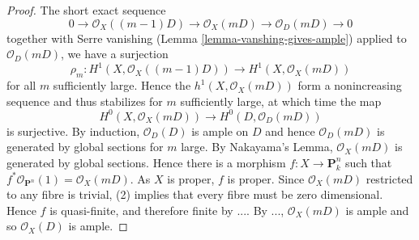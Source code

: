 \begin{proof}
The short exact sequence
$$
0 \longrightarrow \mathcal{O}_X((m-1)D) \longrightarrow \mathcal{O}_X(mD)
\longrightarrow \mathcal{O}_D(mD) \longrightarrow 0
$$
together with Serre vanishing (Lemma \ref{lemma-vanshing-gives-ample}) applied to $\mathcal{O}_D(mD)$,
we have a surjection
$$
\rho_m : H^1(X,\mathcal{O}_X((m -1)D)) \longrightarrow H^1(X,\mathcal{O}_X(mD))
$$
for all $m$ sufficiently large.
Hence the $h^1(X,\mathcal{O}_X(mD))$ form a nonincreasing sequence and thus
stabilizes for $m$ sufficiently large, at which time the map
$$
H^0(X,\mathcal{O}_X(mD)) \longrightarrow H^0(D,\mathcal{O}_D(mD))
$$
is surjective.
By induction, $\mathcal{O}_D(D)$ is ample on $D$ and hence $\mathcal{O}_D(mD)$
is generated by global sections for $m$ large.
By Nakayama's Lemma, $\mathcal{O}_X(mD)$ is generated by global sections.
Hence there is a morphism $f : X \to \mathbf{P}^n_k$ such that
$f^*\mathcal{O}_{\mathbf{P}^n}(1) = \mathcal{O}_X(mD)$.
As $X$ is proper, $f$ is proper.
Since $\mathcal{O}_X(mD)$ restricted to any fibre is trivial, (2) implies that
every fibre must be zero dimensional.
Hence $f$ is quasi-finite, and therefore finite by ....
By ..., $\mathcal{O}_X(mD)$ is ample
and so $\mathcal{O}_X(D)$ is ample.
\end{proof}



